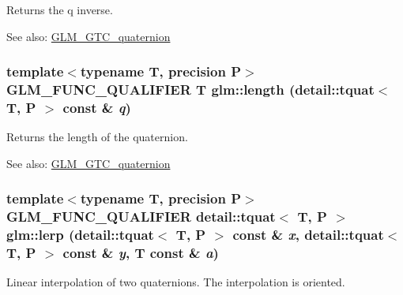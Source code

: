 Returns the q inverse.

\begin{Desc}
\item[See also:]\hyperlink{group__gtc__quaternion}{GLM\_\-GTC\_\-quaternion} \end{Desc}
\hypertarget{group__gtc__quaternion_g286560b01bedb4e046ffb71de22464f4}{
\subsubsection[length]{\setlength{\rightskip}{0pt plus 5cm}template$<$typename T, precision P$>$ GLM\_\-FUNC\_\-QUALIFIER T glm::length (detail::tquat$<$ T, P $>$ const \& {\em q})}}
\label{group__gtc__quaternion_g286560b01bedb4e046ffb71de22464f4}


Returns the length of the quaternion.

\begin{Desc}
\item[See also:]\hyperlink{group__gtc__quaternion}{GLM\_\-GTC\_\-quaternion} \end{Desc}
\hypertarget{group__gtc__quaternion_g7bdb11ee6bfad4eafe2cb71337353ca4}{
\subsubsection[lerp]{\setlength{\rightskip}{0pt plus 5cm}template$<$typename T, precision P$>$ GLM\_\-FUNC\_\-QUALIFIER detail::tquat$<$ T, P $>$ glm::lerp (detail::tquat$<$ T, P $>$ const \& {\em x}, \/  detail::tquat$<$ T, P $>$ const \& {\em y}, \/  T const \& {\em a})}}
\label{group__gtc__quaternion_g7bdb11ee6bfad4eafe2cb71337353ca4}


Linear interpolation of two quaternions. The interpolation is oriented.

